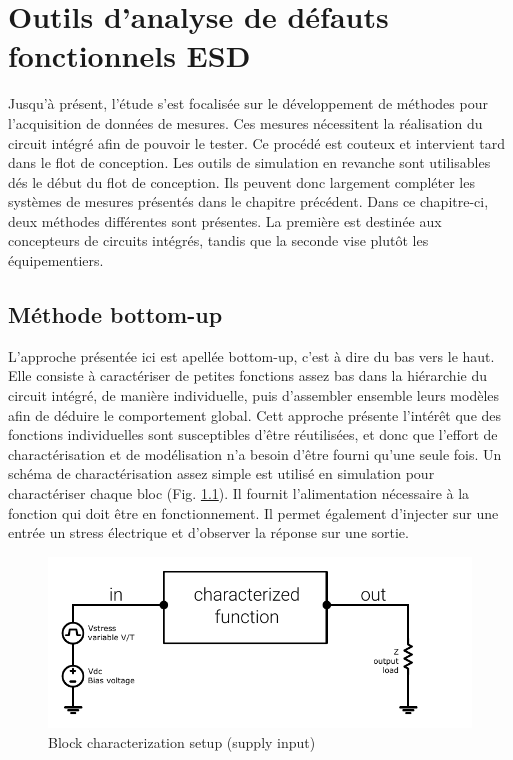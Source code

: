 \chapter{Outils d'analyse de défauts fonctionnels ESD}
\label{chap:4}

Jusqu'à présent, l'étude s'est focalisée sur le développement de méthodes pour l'acquisition de données de mesures.
Ces mesures nécessitent la réalisation du circuit intégré afin de pouvoir le tester.
Ce procédé est couteux et intervient tard dans le flot de conception.
Les outils de simulation en revanche sont utilisables dés le début du flot de conception.
Ils peuvent donc largement compléter les systèmes de mesures présentés dans le chapitre précédent.
Dans ce chapitre-ci, deux méthodes différentes sont présentes.
La première est destinée aux concepteurs de circuits intégrés, tandis que la seconde vise plutôt les équipementiers.

\section{Méthode bottom-up}

L'approche présentée ici est apellée bottom-up, c'est à dire du bas vers le haut.
Elle consiste à caractériser de petites fonctions assez bas dans la hiérarchie du circuit intégré, de manière individuelle, puis d'assembler ensemble leurs modèles afin de déduire le comportement global.
Cett approche présente l'intérêt que des fonctions individuelles sont susceptibles d'être réutilisées, et donc que l'effort de charactérisation et de modélisation n'a besoin d'être fourni qu'une seule fois.
Un schéma de charactérisation assez simple est utilisé en simulation pour charactériser chaque bloc (Fig. \ref{block_function_cz}).
Il fournit l'alimentation nécessaire à la fonction qui doit être en fonctionnement.
Il permet également d'injecter sur une entrée un stress électrique et d'observer la réponse sur une sortie.

\begin{figure}[!h]
  \centering
  \includegraphics{src/1/figures/characterization_setup.pdf}
  \caption{Block characterization setup (supply input)}
  \label{block_function_cz}
\end{figure}

